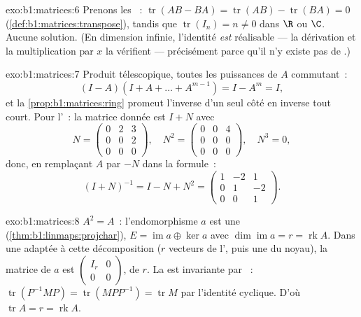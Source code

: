 \begin{solution}{exo:b1:matrices:6}
Prenons les ~: $\operatorname{tr}(AB - BA) = \operatorname{tr}(AB) -
\operatorname{tr}(BA) = 0$ (\cref{def:b1:matrices:transpose}),
tandis que $\operatorname{tr}(I_n) = n \neq 0$ dans $\R$ ou $\C$. Aucune
solution. (En dimension infinie, l'identité \emph{est} réalisable ---
la dérivation et la multiplication par $x$ la vérifient ---
précisément parce qu'il n'y existe pas de .)
\end{solution}

\begin{solution}{exo:b1:matrices:7}
Produit télescopique, toutes les puissances de $A$ commutant~:
\[
(I - A)(I + A + \dots + A^{m-1}) = I - A^m = I ,
\]
et la \cref{prop:b1:matrices:ring} promeut l'inverse d'un seul côté en
inverse tout court. Pour l'~: la matrice donnée est $I + N$
avec
\[
N = \begin{pmatrix} 0 & 2 & 3\\ 0 & 0 & 2\\ 0&0&0 \end{pmatrix},
\quad
N^2 = \begin{pmatrix} 0&0&4\\ 0&0&0\\ 0&0&0\end{pmatrix},
\quad N^3 = 0 ,
\]
donc, en remplaçant $A$ par $-N$ dans la formule~:
\[
(I + N)^{-1} = I - N + N^2 =
\begin{pmatrix}
1 & -2 & 1\\
0 & 1 & -2\\
0 & 0 & 1
\end{pmatrix}.
\]
\end{solution}

\begin{solution}{exo:b1:matrices:8}
$A^2 = A$~: l'endomorphisme $a$ est une 
(\cref{thm:b1:linmaps:projchar}), $E = \operatorname{im} a \oplus
\ker a$ avec $\dim\operatorname{im} a = r = \operatorname{rk} A$. Dans
une  adaptée à cette décomposition ($r$ vecteurs de l', puis
une  du noyau), la matrice de $a$ est
$\begin{pmatrix} I_r & 0\\ 0 & 0\end{pmatrix}$, de  $r$. La
 est invariante par ~:
$\operatorname{tr}(P^{-1}MP) = \operatorname{tr}(MPP^{-1}) =
\operatorname{tr} M$ par l'identité cyclique. D'où
$\operatorname{tr} A = r = \operatorname{rk} A$.
\end{solution}

